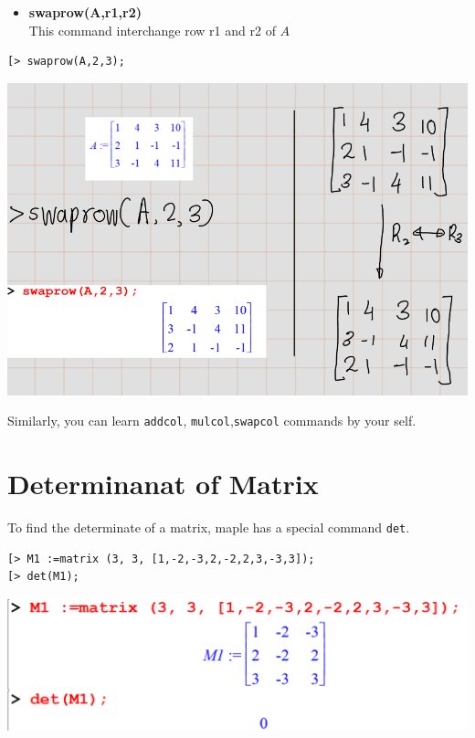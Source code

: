 \documentclass[
]{book}
\providecommand{\tightlist}{%
  \setlength{\itemsep}{0pt}\setlength{\parskip}{0pt}}
\theoremstyle{definition}
\theoremstyle{definition}
\theoremstyle{definition}
\theoremstyle{definition}
\theoremstyle{remark}
\begin{document}
\begin{itemize}
\tightlist
\item
  \textbf{swaprow(A,r1,r2)}\\
  This command interchange row r1 and r2 of \(A\)
\end{itemize}

\begin{verbatim}
[> swaprow(A,2,3);
\end{verbatim}

\includegraphics{figures/Lesson 4/fig11.png}

Similarly, you can learn \texttt{addcol}, \texttt{mulcol},\texttt{swapcol} commands by your self.

\section{Determinanat of Matrix}\label{determinanat-of-matrix}

To find the determinate of a matrix, maple has a special command \texttt{det}.

\begin{verbatim}
[> M1 :=matrix (3, 3, [1,-2,-3,2,-2,2,3,-3,3]);
[> det(M1);
\end{verbatim}

\includegraphics{figures/Lesson 4/fig12.png}
\end{document}
